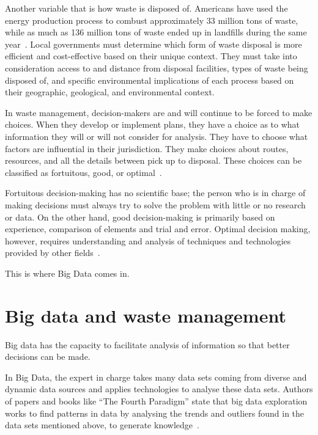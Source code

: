 Another variable that is how waste is disposed of.  Americans have used the 
energy production process to combust approximately 33 million tons of waste,  
while as much as 136 million tons of waste ended up in landfills during the 
same year~\cite{epa2014}. Local governments must determine which form of 
waste disposal is more efficient and cost-effective based on their unique 
context. They must take into consideration access to and distance from 
disposal facilities, types of waste being disposed of, and specific 
environmental implications of each process based on their geographic, 
geological, and environmental context.  

In waste management, decision-makers are and will continue to be forced to 
make choices.  When they develop or implement plans, they have a choice as 
to what information they will or will not consider for analysis.  They have 
to choose what factors are influential in their jurisdiction.  They make 
choices about routes, resources, and all the details between pick up to 
disposal. These choices can be classified as fortuitous, good, or 
optimal~\cite{akbarpour2016}.

Fortuitous decision-making has no scientific base; the person who is in 
charge of making decisions must always try to solve the problem with 
little or no research or data.   On the other hand, good decision-making 
is primarily based on experience, comparison of elements and trial and error. 
 Optimal decision making, however, requires understanding and analysis of 
 techniques and technologies provided by other fields~\cite{akbarpour2016}. 

This is where Big Data comes in. 

\section{ Big data and waste management}

Big data has the capacity to facilitate analysis of information so that 
better decisions can be made.

In Big Data, the expert in charge takes many data sets coming from diverse 
and dynamic data sources and applies technologies to analyse these data sets.  
Authors of papers and books like ``The Fourth Paradigm'' state that big data 
exploration works to find patterns in data by analysing the trends and 
outliers found in the data sets mentioned above, to generate 
knowledge~\cite{hey2009fourth}.

